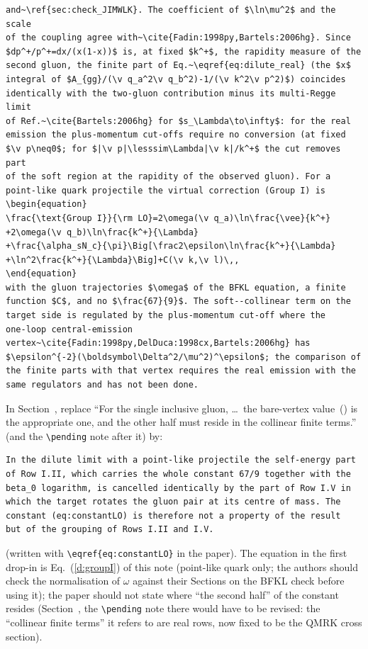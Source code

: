 \begin{verbatim}
and~\ref{sec:check_JIMWLK}. The coefficient of $\ln\mu^2$ and the scale
of the coupling agree with~\cite{Fadin:1998py,Bartels:2006hg}. Since
$dp^+/p^+=dx/(x(1-x))$ is, at fixed $k^+$, the rapidity measure of the
second gluon, the finite part of Eq.~\eqref{eq:dilute_real} (the $x$
integral of $A_{gg}/(\v q_a^2\v q_b^2)-1/(\v k^2\v p^2)$) coincides
identically with the two-gluon contribution minus its multi-Regge limit
of Ref.~\cite{Bartels:2006hg} for $s_\Lambda\to\infty$: for the real
emission the plus-momentum cut-offs require no conversion (at fixed
$\v p\neq0$; for $|\v p|\lesssim\Lambda|\v k|/k^+$ the cut removes part
of the soft region at the rapidity of the observed gluon). For a
point-like quark projectile the virtual correction (Group I) is
\begin{equation}
\frac{\text{Group I}}{\rm LO}=2\omega(\v q_a)\ln\frac{\vee}{k^+}
+2\omega(\v q_b)\ln\frac{k^+}{\Lambda}
+\frac{\alpha_sN_c}{\pi}\Big[\frac2\epsilon\ln\frac{k^+}{\Lambda}
+\ln^2\frac{k^+}{\Lambda}\Big]+C(\v k,\v l)\,,
\end{equation}
with the gluon trajectories $\omega$ of the BFKL equation, a finite
function $C$, and no $\frac{67}{9}$. The soft--collinear term on the
target side is regulated by the plus-momentum cut-off where the
one-loop central-emission
vertex~\cite{Fadin:1998py,DelDuca:1998cx,Bartels:2006hg} has
$\epsilon^{-2}(\boldsymbol\Delta^2/\mu^2)^\epsilon$; the comparison of
the finite parts with that vertex requires the real emission with the
same regulators and has not been done.
\end{verbatim}
\noindent In Section~, replace ``For the single inclusive gluon, \dots\ the bare-vertex value~() is the appropriate one, and the other half must reside in the collinear finite terms.'' (and the \texttt{\textbackslash pending} note after it) by:
\begin{verbatim}
In the dilute limit with a point-like projectile the self-energy part
of Row I.II, which carries the whole constant 67/9 together with the
beta_0 logarithm, is cancelled identically by the part of Row I.V in
which the target rotates the gluon pair at its centre of mass. The
constant (eq:constantLO) is therefore not a property of the result
but of the grouping of Rows I.II and I.V.
\end{verbatim}
\noindent (written with \texttt{\textbackslash eqref\{eq:constantLO\}} in the paper). The equation in the first drop-in is Eq.~(\ref{d:groupI}) of this note (point-like quark only; the authors should check the normalisation of $\omega$ against their Sections on the BFKL check before using it); the paper should not state where ``the second half'' of the constant resides (Section~, the \texttt{\textbackslash pending} note there would have to be revised: the ``collinear finite terms'' it refers to are real rows, now fixed to be the QMRK cross section).
